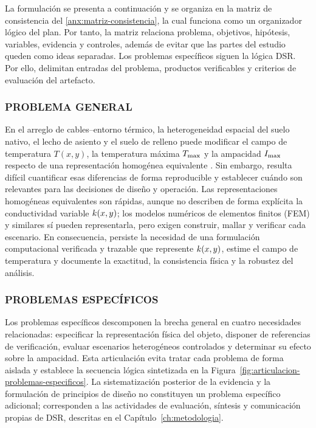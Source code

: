La formulación se presenta a continuación y se organiza en la matriz de consistencia del \ref{anx:matriz-consistencia}, la cual funciona como un organizador lógico del plan. Por tanto, la matriz relaciona problema, objetivos, hipótesis, variables, evidencia y controles, además de evitar que las partes del estudio queden como ideas separadas. Los problemas específicos siguen la lógica DSR. Por ello, delimitan entradas del problema, productos verificables y criterios de evaluación del artefacto.

\subsubsection{PROBLEMA GENERAL}

En el arreglo de cables--entorno térmico, la heterogeneidad espacial del suelo nativo, el lecho de asiento y el suelo de relleno puede modificar el campo de temperatura $T(x,y)$, la temperatura máxima $T_{\max}$ y la ampacidad $I_{\max}$ respecto de una representación homogénea equivalente \parencites[4--6]{enescu2021}[3--4,93--99]{cigre2025}. Sin embargo, resulta difícil cuantificar esas diferencias de forma reproducible y establecer cuándo son relevantes para las decisiones de diseño y operación. Las representaciones homogéneas equivalentes son rápidas, aunque no describen de forma explícita la conductividad variable $k(x,y)$; los modelos numéricos de elementos finitos (FEM) y similares sí pueden representarla, pero exigen construir, mallar y verificar cada escenario. En consecuencia, persiste la necesidad de una formulación computacional verificada y trazable que represente $k(x,y)$, estime el campo de temperatura y documente la exactitud, la consistencia física y la robustez del análisis.

\subsubsection{PROBLEMAS ESPECÍFICOS}

Los problemas específicos descomponen la brecha general en cuatro necesidades relacionadas: especificar la representación física del objeto, disponer de referencias de verificación, evaluar escenarios heterogéneos controlados y determinar su efecto sobre la ampacidad. Esta articulación evita tratar cada problema de forma aislada y establece la secuencia lógica sintetizada en la Figura~\ref{fig:articulacion-problemas-especificos}. La sistematización posterior de la evidencia y la formulación de principios de diseño no constituyen un problema específico adicional; corresponden a las actividades de evaluación, síntesis y comunicación propias de DSR, descritas en el Capítulo~\ref{ch:metodologia}.

